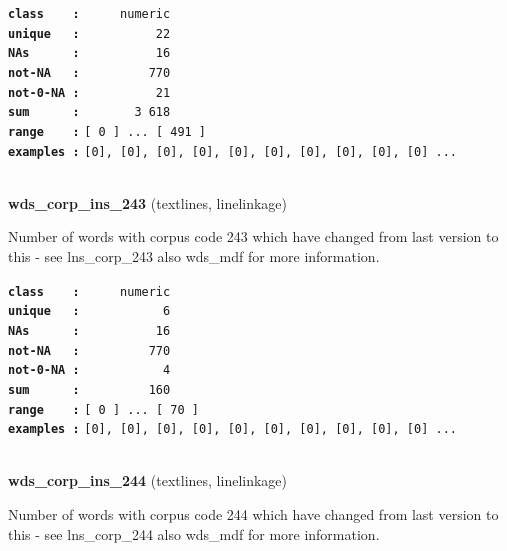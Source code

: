 \documentclass[]{article}
\begin{document}
\textbf{\texttt{class\ \ \ \ :}} \texttt{~~~~~numeric}\\
\textbf{\texttt{unique\ \ \ :}} \texttt{~~~~~~~~~~22}\\
\textbf{\texttt{NAs\ \ \ \ \ \ :}} \texttt{~~~~~~~~~~16}\\
\textbf{\texttt{not-NA\ \ \ :}} \texttt{~~~~~~~~~770}\\
\textbf{\texttt{not-0-NA\ :}} \texttt{~~~~~~~~~~21}\\
\textbf{\texttt{sum\ \ \ \ \ \ :}} \texttt{~~~~~~~3~618}\\
\textbf{\texttt{range\ \ \ \ :}}
\texttt{{[}\ 0\ {]}\ ...\ {[}\ 491\ {]}}\\
\textbf{\texttt{examples\ :}}
\texttt{{[}0{]},\ {[}0{]},\ {[}0{]},\ {[}0{]},\ {[}0{]},\ {[}0{]},\ {[}0{]},\ {[}0{]},\ {[}0{]},\ {[}0{]}\ ...}\\

~

\textbf{wds\_corp\_ins\_243} (textlines, linelinkage)

Number of words with corpus code 243 which have changed from last
version to this - see lns\_corp\_243 also wds\_mdf for more information.

\textbf{\texttt{class\ \ \ \ :}} \texttt{~~~~~numeric}\\
\textbf{\texttt{unique\ \ \ :}} \texttt{~~~~~~~~~~~6}\\
\textbf{\texttt{NAs\ \ \ \ \ \ :}} \texttt{~~~~~~~~~~16}\\
\textbf{\texttt{not-NA\ \ \ :}} \texttt{~~~~~~~~~770}\\
\textbf{\texttt{not-0-NA\ :}} \texttt{~~~~~~~~~~~4}\\
\textbf{\texttt{sum\ \ \ \ \ \ :}} \texttt{~~~~~~~~~160}\\
\textbf{\texttt{range\ \ \ \ :}}
\texttt{{[}\ 0\ {]}\ ...\ {[}\ 70\ {]}}\\
\textbf{\texttt{examples\ :}}
\texttt{{[}0{]},\ {[}0{]},\ {[}0{]},\ {[}0{]},\ {[}0{]},\ {[}0{]},\ {[}0{]},\ {[}0{]},\ {[}0{]},\ {[}0{]}\ ...}\\

~

\textbf{wds\_corp\_ins\_244} (textlines, linelinkage)

Number of words with corpus code 244 which have changed from last
version to this - see lns\_corp\_244 also wds\_mdf for more information.
\end{document}
